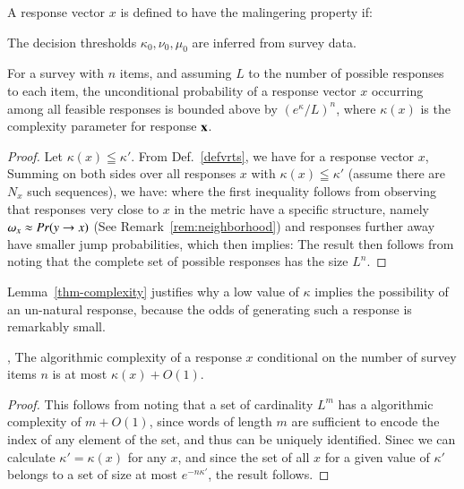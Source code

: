 \documentclass[onecolumn,10pt]{IEEEtran}
\begin{document}
\begin{defn}
  A response vector $x$  is defined to  have the malingering property if:
\end{defn}
The decision thresholds $\kappa_0,\nu_0,\mu_0$ are  inferred  from  survey data.
\begin{lem}[Complexity]\label{thm-complexity}
  For a survey with $n$ items, and assuming $L$ to the  number of possible responses to each item, the unconditional probability of a response vector $x$ occurring among all feasible responses is bounded above by
  $(e^\kappa / L)^n$, where $\kappa(x) $ is the complexity parameter for response $\bm{\mathrm{x}}$.
\end{lem}

\begin{proof} Let $\kappa(x) \leqq \kappa'$. From Def.~\ref{defvrts},   we have for a response vector $x$, 
  Summing on both sides over all responses $x $ with $\kappa(x)\leqq \kappa'$ (assume there are $N_x$ such sequences), we have:
  where the first inequality follows from observing that responses very close to $x$ in the \qdist metric have a specific structure, namely $\omega_{x} \approx Pr(y \rightarrow x)$ (See Remark~\ref{rem:neighborhood}) and responses further away have smaller jump probabilities, which then  implies:
  The result then follows from noting that the complete set of possible responses has the size $L^n$.
\end{proof}
% 
Lemma~\ref{thm-complexity} justifies why a low value of $\kappa$ implies the possibility of an un-natural response, because the odds of generating such a response is remarkably small.
%
\begin{cor}
, The algorithmic complexity of a response $x$ conditional on the number of survey items $n$ is at most  $\kappa(x) + O(1) $.
\end{cor}
\begin{proof}
This follows from noting that a set of cardinality $L^m$ has a algorithmic complexity of $m + O(1)$, since words of length $m$ are sufficient to encode the index of any element of the set, and thus can be uniquely identified. Sinec we can calculate $\kappa'=\kappa(x)$ for any $x$, and since the set of all $x$ for a given value of $\kappa'$ belongs to a set of size at most $e^{ -n \kappa' }$, the result follows.
\end{proof}
\end{document}
